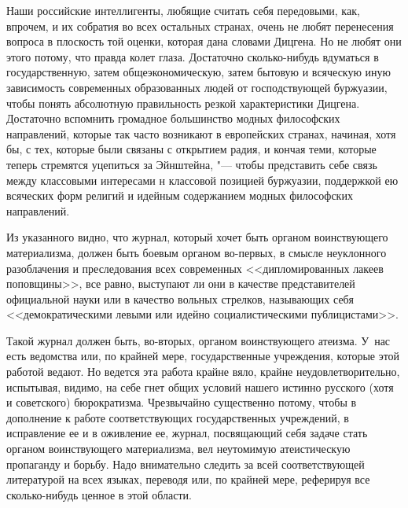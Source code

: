 Наши российские интеллигенты, любящие считать себя передовыми, как, впрочем,
и их собратия во всех остальных странах, очень не любят перенесения вопроса
в плоскость той оценки, которая дана словами Дицгена. Но не любят они этого
потому, что правда колет глаза. Достаточно сколько-нибудь вдуматься в
государственную, затем общеэкономическую, затем бытовую и всяческую иную
зависимость современных образованных людей от господствующей буржуазии,
чтобы понять абсолютную правильность резкой характеристики Дицгена.
Достаточно вспомнить громадное большинство модных философских направлений,
которые так часто возникают в европейских странах, начиная, хотя бы, с тех,
которые были связаны с открытием радия, и кончая теми, которые теперь
стремятся уцепиться за Эйнштейна, "--- чтобы представить себе связь между
классовыми интересами н классовой позицией буржуазии, поддержкой ею
всяческих форм религий и идейным содержанием модных философских
направлений.

Из указанного видно, что журнал, который хочет быть органом воинствующего
материализма, должен быть боевым органом во-первых, в смысле неуклонного
разоблачения и преследования всех современных <<дипломированных лакеев
поповщины>>, все равно, выступают ли они в качестве представителей
официальной науки или в качество вольных стрелков, называющих себя
<<демократическими левыми или идейно социалистическими публицистами>>.

Такой журнал должен быть, во-вторых, органом воинствующего атеизма. У~нас
есть ведомства или, по крайней мере, государственные учреждения, которые
этой работой ведают. Но ведется эта работа крайне вяло, крайне
неудовлетворительно, испытывая, видимо, на себе гнет общих условий нашего
истинно русского (хотя и советского) бюрократизма. Чрезвычайно существенно
потому, чтобы в дополнение к работе соответствующих государственных
учреждений, в исправление ее и в оживление ее, журнал, посвящающий себя
задаче стать органом воинствующего материализма, вел неутомимую
атеистическую пропаганду и борьбу. Надо внимательно следить за всей
соответствующей литературой на всех языках, переводя или, по крайней мере,
реферируя все сколько-нибудь ценное в этой области.

